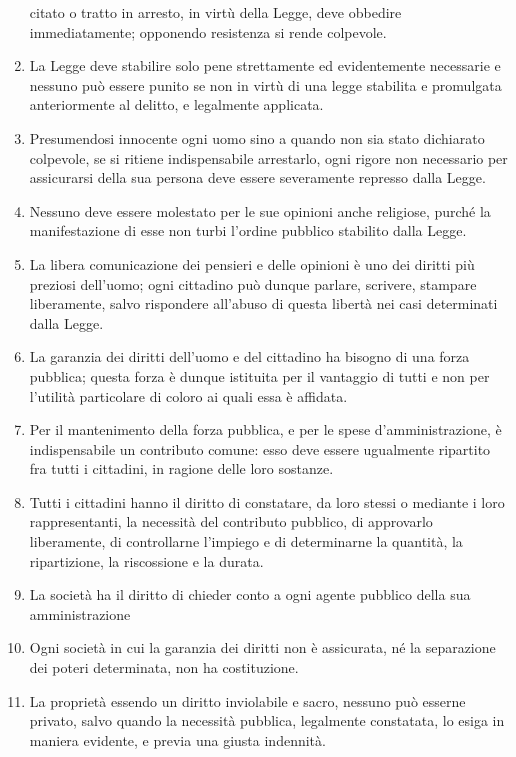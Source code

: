 \documentclass[a4paper]{article}
\begin{document}
\begin{enumerate}
    citato o tratto in arresto, in virtù della Legge, deve obbedire immediatamente;
    opponendo resistenza si rende colpevole.
    \item La Legge deve stabilire solo pene strettamente ed evidentemente necessarie e
    nessuno può essere punito se non in virtù di una legge stabilita e promulgata
    anteriormente al delitto, e legalmente applicata.
    \item Presumendosi innocente ogni uomo sino a quando non sia stato dichiarato
    colpevole, se si ritiene indispensabile arrestarlo, ogni rigore non necessario per
    assicurarsi della sua persona deve essere severamente represso dalla Legge.
    \item Nessuno deve essere molestato per le sue opinioni anche religiose, purché la
    manifestazione di esse non turbi l'ordine pubblico stabilito dalla Legge.
    \item La libera comunicazione dei pensieri e delle opinioni è uno dei diritti più preziosi
    dell'uomo; ogni cittadino può dunque parlare, scrivere, stampare liberamente, salvo
    rispondere all'abuso di questa libertà nei casi determinati dalla Legge.
    \item La garanzia dei diritti dell'uomo e del cittadino ha bisogno di una forza pubblica;
    questa forza è dunque istituita per il vantaggio di tutti e non per l'utilità particolare di
    coloro ai quali essa è affidata.
    \item Per il mantenimento della forza pubblica, e per le spese d'amministrazione, è
    indispensabile un contributo comune: esso deve essere ugualmente ripartito fra tutti i
    cittadini, in ragione delle loro sostanze.
    \item Tutti i cittadini hanno il diritto di constatare, da loro stessi o mediante i loro
    rappresentanti, la necessità del contributo pubblico, di approvarlo liberamente, di
    controllarne l'impiego e di determinarne la quantità, la ripartizione, la riscossione e la
    durata.
    \item La società ha il diritto di chieder conto a ogni agente pubblico della sua
    amministrazione
    \item Ogni società in cui la garanzia dei diritti non è assicurata, né la separazione dei
    poteri determinata, non ha costituzione.
    \item La proprietà essendo un diritto inviolabile e sacro, nessuno può esserne privato,
    salvo quando la necessità pubblica, legalmente constatata, lo esiga in maniera evidente,
    e previa una giusta indennità.
\end{enumerate}
\end{document}
